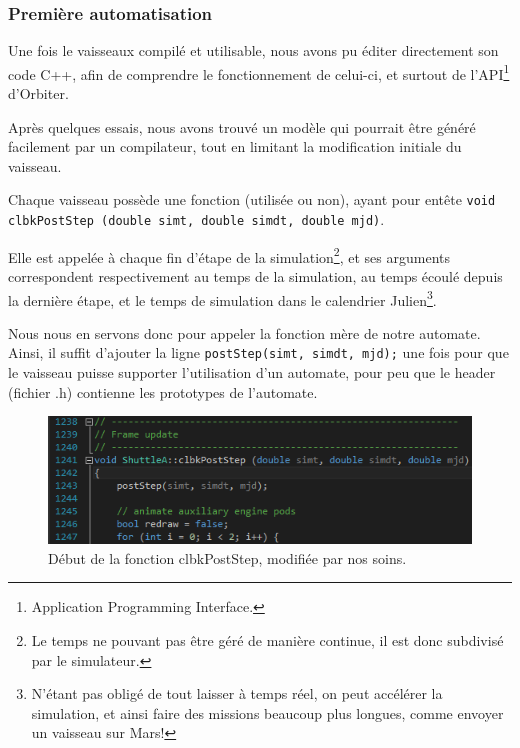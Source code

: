 \documentclass[a4paper,11pt]{article}
\begin{document}

    \subsubsection{Première automatisation}
        Une fois le vaisseaux compilé et utilisable, nous avons pu éditer directement son code C++, afin de comprendre le fonctionnement de celui-ci, et surtout de l'API\footnote{Application Programming Interface.} d'Orbiter.

        Après quelques essais, nous avons trouvé un modèle qui pourrait être généré facilement par un compilateur, tout en limitant la modification initiale du vaisseau.
        
        Chaque vaisseau possède une fonction (utilisée ou non), ayant pour entête \texttt{void clbkPostStep (double simt, double simdt, double mjd)}. 
        
        Elle est appelée à chaque fin d'étape de la simulation\footnote{Le temps ne pouvant pas être géré de manière continue, il est donc subdivisé par le simulateur.}, et ses arguments correspondent respectivement au temps de la simulation, au temps écoulé depuis la dernière étape, et le temps de simulation dans le calendrier Julien\footnote{N'étant pas obligé de tout laisser à temps réel, on peut accélérer la simulation, et ainsi faire des missions beaucoup plus longues, comme envoyer un vaisseau sur Mars!}.
        
        Nous nous en servons donc pour appeler la fonction \og mère\fg{} de notre automate. Ainsi, il suffit d'ajouter la ligne \texttt{postStep(simt, simdt, mjd);} une fois pour que le vaisseau puisse supporter l'utilisation d'un automate, pour peu que le header (fichier .h) contienne les prototypes de l'automate.
        
        \begin{figure}[!h]
            \begin{center}
                \includegraphics[width=1\textwidth]{img/post_step.png}
                \caption{Début de la fonction clbkPostStep, modifiée par nos soins.}
            \end{center}
        \end{figure}
        
\end{document}
